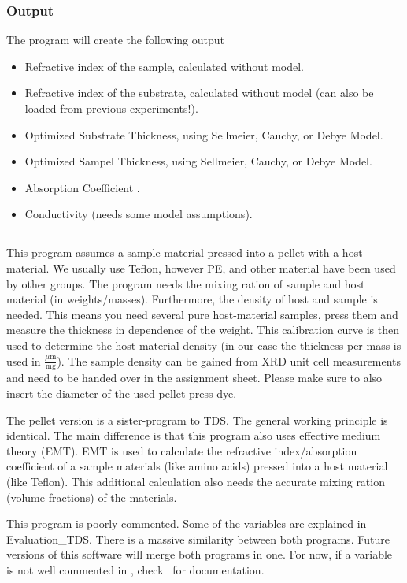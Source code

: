 \documentclass[12pt]{article}
\begin{document}
\subsubsection{Output}
The program will create the following output
\begin{itemize}
\item Refractive index of the sample, calculated without model.
\item Refractive index of the substrate, calculated without model (can also be loaded from previous experiments!).
\item Optimized Substrate Thickness, using Sellmeier, Cauchy, or Debye Model.
\item Optimized Sampel Thickness, using Sellmeier, Cauchy, or Debye Model.
\item Absorption Coefficient .
\item Conductivity (needs some model assumptions).
\end{itemize}


\subsection{\pellet}
This program assumes a sample material pressed into a pellet with a host material. We usually use Teflon, however PE, and other material have been used by other groups. The program needs the mixing ration of sample and host material (in weights/masses). Furthermore, the density of host and sample is needed. This means you need several pure host-material samples, press them and measure the thickness in dependence of the weight. This calibration curve is then used to determine the host-material density (in our case the thickness per mass is used in $\frac{\mu \mathrm{m}}{\mathrm{mg}}$). The sample density can be gained from XRD unit cell measurements and need to be handed over in the assignment sheet. Please make sure to also insert the diameter of the used pellet press dye. 

The pellet version is a sister-program to TDS. The general working principle is identical. The main difference is that this program also uses effective medium theory (EMT). EMT is used to calculate the refractive index/absorption coefficient of a sample materials (like amino acids) pressed into a host material (like Teflon). This additional calculation also needs the accurate mixing ration (volume fractions) of the materials. 

This program is poorly commented. Some of the variables are explained in Evaluation\_TDS. There is a massive similarity between both programs. Future versions of this software will merge both programs in one. For now, if a variable is not well commented in \pellet, check \TDS~for documentation. 
\end{document}
